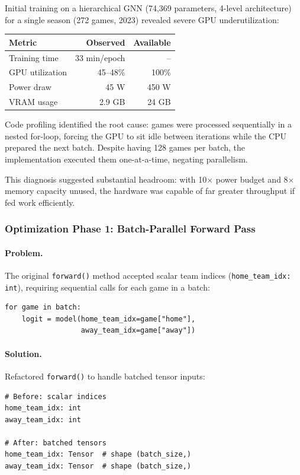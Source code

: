 Initial training on a hierarchical GNN (74,369 parameters, 4-level architecture) for a single season (272 games, 2023) revealed severe GPU underutilization:

\begin{center}
\begin{tabular}{lrr}
\toprule
\textbf{Metric} & \textbf{Observed} & \textbf{Available} \\
\midrule
Training time & 33 min/epoch & -- \\
GPU utilization & 45--48\% & 100\% \\
Power draw & 45 W & 450 W \\
VRAM usage & 2.9 GB & 24 GB \\
\bottomrule
\end{tabular}
\end{center}

Code profiling identified the root cause: games were processed sequentially in a nested for-loop, forcing the GPU to sit idle between iterations while the CPU prepared the next batch. Despite having 128 games per batch, the implementation executed them one-at-a-time, negating parallelism.

This diagnosis suggested substantial headroom: with 10$\times$ power budget and 8$\times$ memory capacity unused, the hardware was capable of far greater throughput if fed work efficiently.

\subsubsection{Optimization Phase 1: Batch-Parallel Forward Pass}

\paragraph{Problem.} The original \texttt{forward()} method accepted scalar team indices (\texttt{home\_team\_idx: int}), requiring sequential calls for each game in a batch:
\begin{verbatim}
for game in batch:
    logit = model(home_team_idx=game["home"],
                  away_team_idx=game["away"])
\end{verbatim}

\paragraph{Solution.} Refactored \texttt{forward()} to handle batched tensor inputs:
\begin{verbatim}
# Before: scalar indices
home_team_idx: int
away_team_idx: int

# After: batched tensors
home_team_idx: Tensor  # shape (batch_size,)
away_team_idx: Tensor  # shape (batch_size,)
\end{verbatim}

